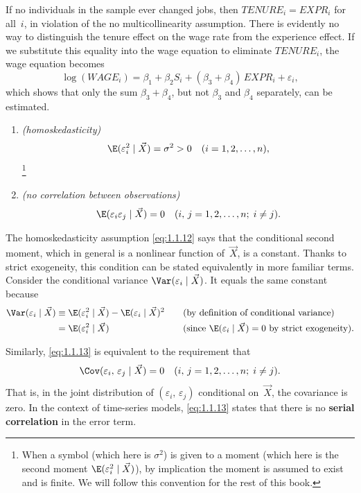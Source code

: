 \begin{example}
\label{ex:1.4}
If no individuals in the sample ever changed jobs, then
$\mathit{TENURE}_i = \mathit{EXPR}_i$ for all~$i$, in violation of the no
multicollinearity assumption.  There is evidently no way to distinguish the
tenure effect on the wage rate from the experience effect.  If we substitute
this equality into the wage equation to eliminate $\mathit{TENURE}_i$, the wage
equation becomes
\[
  \log(\mathit{WAGE}_i)
  = \beta_1 + \beta_2 S_i + (\beta_3 + \beta_4)\,\mathit{EXPR}_i + \varepsilon_i,
\]
which shows that only the sum $\beta_3 + \beta_4$, but not $\beta_3$ and
$\beta_4$ separately, can be estimated.
\end{example}

\begin{assumption}
\label{ass:1.4}
\leavevmode
\begin{enumerate}[label=\upshape(\roman*)]
\item \emph{(homoskedasticity)}
\begin{equation}
  \E(\varepsilon_i^2 \mid \vec{X}) = \sigma^2 > 0
  \quad (i = 1, 2, \ldots, n),
  \label{eq:1.1.12}
\end{equation}%
\footnote{When a symbol (which here is $\sigma^2$) is given to a moment (which
here is the second moment $\E(\varepsilon_i^2 \mid \vec{X})$), by implication
the moment is assumed to exist and is finite.  We will follow this convention
for the rest of this book.}

\item \emph{(no correlation between observations)}
\begin{equation}
  \E(\varepsilon_i \varepsilon_j \mid \vec{X}) = 0
  \quad (i,\, j = 1, 2, \ldots, n;\; i \neq j).
  \label{eq:1.1.13}
\end{equation}
\end{enumerate}
\end{assumption}

The homoskedasticity assumption \eqref{eq:1.1.12} says that the conditional
second moment, which in general is a nonlinear function of~$\vec{X}$, is a
constant.  Thanks to strict exogeneity, this condition can be stated
equivalently in more familiar terms.  Consider the conditional variance
$\Var(\varepsilon_i \mid \vec{X})$.  It equals the same constant because
\begin{align*}
  \Var(\varepsilon_i \mid \vec{X})
    &\equiv \E(\varepsilon_i^2 \mid \vec{X})
            - \E(\varepsilon_i \mid \vec{X})^2
       &\quad&\text{(by definition of conditional variance)} \\
    &= \E(\varepsilon_i^2 \mid \vec{X})
       &&\text{(since $\E(\varepsilon_i \mid \vec{X}) = 0$
               by strict exogeneity)}.
\end{align*}

Similarly, \eqref{eq:1.1.13} is equivalent to the requirement that
\[
  \Cov(\varepsilon_i,\, \varepsilon_j \mid \vec{X}) = 0
  \quad (i,\, j = 1, 2, \ldots, n;\; i \neq j).
\]
That is, in the joint distribution of $(\varepsilon_i,\, \varepsilon_j)$
conditional on~$\vec{X}$, the covariance is zero.  In the context of
time-series models, \eqref{eq:1.1.13} states that there is no \textbf{serial
correlation} in the error term.
